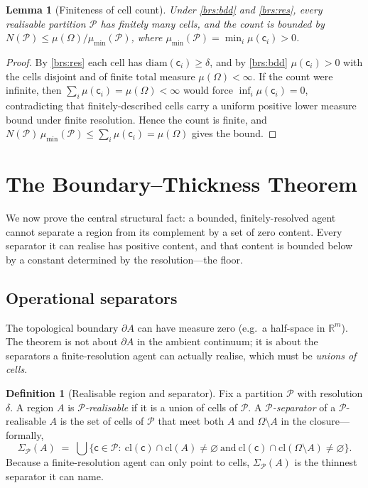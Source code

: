 \documentclass[11pt,a4paper]{article}
\theoremstyle{thmstyle}
\newtheorem{lemma}[theorem]{Lemma}
\theoremstyle{definition}
\newtheorem{definition}[theorem]{Definition}
\theoremstyle{remark}
\newcommand{\R}{\mathbb{R}}
\newcommand{\Space}{\Omega}
\newcommand{\Bdy}{\partial}
\newcommand{\cl}{\mathrm{cl}}
\newcommand{\diam}{\mathrm{diam}}
\newcommand{\reso}{\delta}
\newcommand{\Part}{\mathscr{P}}
\newcommand{\cell}{\mathsf{c}}
\begin{document}
\begin{lemma}[Finiteness of cell count]
\label{lem:finite-cells}
Under \ref{brs:bdd} and \ref{brs:res}, every realisable partition $\Part$ has
finitely many cells, and the count is bounded by
$N(\Part)\le \mu(\Space)/\mu_{\min}(\Part)$, where
$\mu_{\min}(\Part)=\min_i\mu(\cell_i)>0$.
\end{lemma}

\begin{proof}
By \ref{brs:res} each cell has $\diam(\cell_i)\ge\reso$, and by
\ref{brs:bdd} $\mu(\cell_i)>0$ with the cells disjoint and of finite total
measure $\mu(\Space)<\infty$. If the count were infinite, then
$\sum_i\mu(\cell_i)=\mu(\Space)<\infty$ would force
$\inf_i\mu(\cell_i)=0$, contradicting that finitely-described cells carry a
uniform positive lower measure bound under finite resolution. Hence the count
is finite, and $N(\Part)\,\mu_{\min}(\Part)\le\sum_i\mu(\cell_i)=\mu(\Space)$
gives the bound.
\end{proof}


\section{The Boundary--Thickness Theorem}
\label{sec:thickness}

We now prove the central structural fact: a bounded, finitely-resolved agent
cannot separate a region from its complement by a set of zero content. Every
separator it can realise has positive content, and that content is bounded
below by a constant determined by the resolution---the floor.

\subsection{Operational separators}

The topological boundary $\Bdy A$ can have measure zero (e.g.\ a half-space in
$\R^m$). The theorem is not about $\Bdy A$ in the ambient continuum; it is about
the separators a finite-resolution agent can actually realise, which must be
\emph{unions of cells}.

\begin{definition}[Realisable region and separator]
\label{def:realisable}
Fix a partition $\Part$ with resolution $\reso$. A region $A$ is
\emph{$\Part$-realisable} if it is a union of cells of $\Part$. A
\emph{$\Part$-separator} of a $\Part$-realisable $A$ is the set of cells of
$\Part$ that meet both $A$ and $\Space\setminus A$ in the closure---formally,
\[
\Sigma_\Part(A)\;=\;\bigcup\bigl\{\cell\in\Part:\ \cl(\cell)\cap\cl(A)\neq\varnothing
\ \text{and}\ \cl(\cell)\cap\cl(\Space\setminus A)\neq\varnothing\bigr\}.
\]
Because a finite-resolution agent can only point to cells, $\Sigma_\Part(A)$ is
the thinnest separator it can name.
\end{definition}
\end{document}
